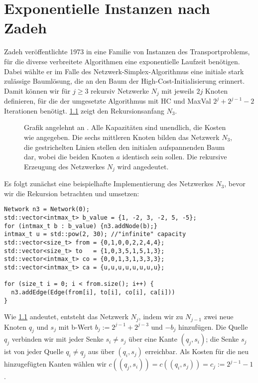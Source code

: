 \chapter{Exponentielle Instanzen nach Zadeh}\label{ch:lit}
Zadeh veröffentlichte 1973 in \cite{Exponential} eine Familie von Instanzen des Transportproblems, für die diverse verbreitete Algorithmen eine exponentielle Laufzeit benötigen. Dabei wählte er im Falle des Netzwerk-Simplex-Algorithmus eine initiale stark zulässige Baumlösung, die an den Baum der High-Cost-Initialisierung erinnert. Damit können wir für $j\geq 3$ rekursiv Netzwerke $N_j$ mit jeweils $2j$ Knoten definieren, für die der umgesetzte Algorithmus mit HC und MaxVal $2^j + 2^{j-1} - 2$ Iterationen benötigt. \cref{fig:N3} zeigt den Rekursionsanfang $N_3$.
\begin{figure}[!ht]\centering
    
    \caption{Grafik angelehnt an \cite[S. 261]{Exponential}. Alle Kapazitäten sind unendlich, die Kosten wie angegeben. Die sechs mittleren Knoten bilden das Netzwerk $N_3$, die gestrichelten Linien stellen den initialen aufspannenden Baum dar, wobei die beiden Knoten $a$ identisch sein sollen. Die rekursive Erzeugung des Netzwerkes $N_j$ wird angedeutet.}
    \label{fig:N3}
\end{figure}

Es folgt zunächst eine beispielhafte Implementierung des Netzwerkes $N_3$, bevor wir die Rekursion betrachten und umsetzen:

\begin{lstlisting}
Network n3 = Network(0);
std::vector<intmax_t> b_value = {1, -2, 3, -2, 5, -5};
for (intmax_t b : b_value) {n3.addNode(b);}
intmax_t u = std::pow(2, 30); //"infinite" capacity
std::vector<size_t> from = {0,1,0,0,2,2,4,4};
std::vector<size_t> to   = {1,0,3,5,1,5,1,3};
std::vector<intmax_t> co = {0,0,1,3,1,3,3,3};
std::vector<intmax_t> ca = {u,u,u,u,u,u,u,u};

for (size_t i = 0; i < from.size(); i++) {
  n3.addEdge(Edge(from[i], to[i], co[i], ca[i]))
}
\end{lstlisting}

Wie \cref{fig:N3} andeutet, entsteht das Netzwerk $N_j$, indem wir zu $N_{j-1}$ zwei neue Knoten $q_j$ und $s_j$ mit b-Wert $b_j:=2^{j-1} + 2^{j-3}$ und $-b_j$ hinzufügen. Die Quelle $q_j$ verbinden wir mit jeder Senke $s_i\neq s_j$ über eine Kante $(q_j,s_i)$; die Senke $s_j$ ist von jeder Quelle $q_i\neq q_j$ aus über $(q_i,s_j)$ erreichbar. Als Kosten für die neu hinzugefügten Kanten wählen wir $c((q_j,s_i))=c((q_i,s_j))=c_j:=2^{j-1}-1$.

